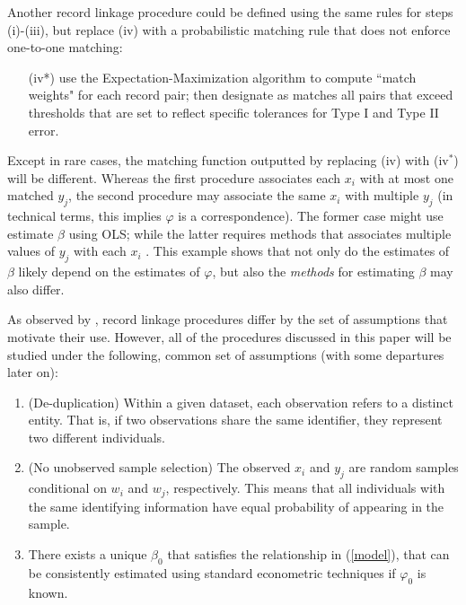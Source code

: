 \documentclass[12pt]{article}
\begin{document}
Another record linkage procedure could be defined using the same rules for steps (i)-(iii), but replace (iv) with a probabilistic matching rule that does not enforce one-to-one matching:
\begin{enumerate}
\item[(iv*)]  use the Expectation-Maximization algorithm to compute ``match weights" for each record pair; then designate as matches all pairs that exceed thresholds that are set to reflect specific tolerances for Type I and Type II error.
\end{enumerate} 

Except in rare cases, the matching function outputted by replacing (iv) with (iv$^*$) will be different.  Whereas the first procedure associates each $x_i$ with at most one matched $y_j$, the second procedure may associate the same $x_i$ with multiple $y_j$ (in technical terms, this implies $\varphi$ is a correspondence).  The former case might use  estimate $\beta$ using OLS; while the latter requires methods that associates multiple values of $y_j$ with each $x_i$ \citep{ahl2019}.  This example shows that not only do the estimates of $\beta$ likely depend on the estimates of $\varphi$, but also the \textit{methods} for estimating $\beta$ may also differ. 

As observed by \cite{bailey2017}, record linkage procedures differ by the set of assumptions that motivate their use.  However, all of the procedures discussed in this paper will be studied under the following, common set of assumptions (with some departures later on):
\begin{enumerate}
\item (De-duplication) Within a given dataset, each observation refers to a distinct entity.  That is, if two observations share the same identifier, they represent two different individuals.
\item (No unobserved sample selection) The observed $x_i$ and $y_j$ are random samples conditional on $w_i$ and $w_j$, respectively.  This means that all individuals with the same identifying information have equal probability of appearing in the sample. 
\item There exists a unique $\beta_0$ that satisfies the relationship in (\ref{model}), that can be consistently estimated using standard econometric techniques if $\varphi_0$ is known.
\end{enumerate}
\end{document}
